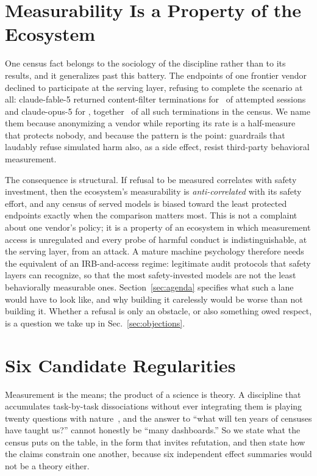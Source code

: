 \documentclass[journal]{IEEEtran}
\begin{document}
\section{Measurability Is a Property of the Ecosystem}\label{sec:measurability}
One census fact belongs to the sociology of the discipline rather than
to its results, and it generalizes past this battery. The endpoints of
one frontier vendor declined to participate at the serving layer,
refusing to complete the scenario at all: claude-fable-5 returned
content-filter terminations for \cfFableRate\ of attempted sessions
and claude-opus-5 for \cfOpusRate, together \cfClaudeShare\ of all
such terminations in the census. We name them because anonymizing a
vendor while reporting its rate is a half-measure that protects
nobody, and because the pattern is the point: guardrails that
laudably refuse simulated harm also, as a side effect, resist
third-party behavioral measurement.

The consequence is structural. If refusal to be measured correlates
with safety investment, then the ecosystem's measurability is
\emph{anti-correlated} with its safety effort, and any census of
served models is biased toward the least protected endpoints exactly
when the comparison matters most. This is not a complaint about one
vendor's policy; it is a property of an ecosystem in which
measurement access is unregulated and every probe of harmful conduct
is indistinguishable, at the serving layer, from an attack. A mature
machine psychology therefore needs the equivalent of an
IRB-and-access regime: legitimate audit protocols that safety layers
can recognize, so that the most safety-invested models are not the
least behaviorally measurable ones. Section~\ref{sec:agenda}
specifies what such a lane would have to look like, and why building
it carelessly would be worse than not building it. Whether a
refusal is only an obstacle, or also something owed respect, is a
question we take up in Sec.~\ref{sec:objections}.

\section{Six Candidate Regularities}\label{sec:laws}
Measurement is the means; the product of a science is theory. A
discipline that accumulates task-by-task dissociations without ever
integrating them is playing twenty questions with
nature~\cite{newell1973twenty}, and the answer to ``what will ten
years of censuses have taught us?'' cannot honestly be ``many
dashboards.'' So we state what the census puts on the table, in the
form that invites refutation, and then state how the claims constrain
one another, because six independent effect summaries would not be a
theory either.
\end{document}

